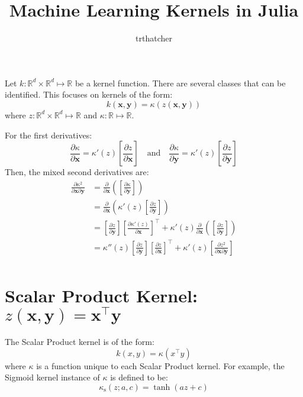 \documentclass[12pt, a4paper]{article}
\begin{document}

\title{Machine Learning Kernels in Julia}
\author{trthatcher}
\maketitle

Let $k:\mathbb{R}^d \times \mathbb{R}^d \mapsto \mathbb{R}$ be a kernel function. There are several classes that can be identified. This focuses on kernels of the form:
\begin{equation*}
    k(\mathbf{x}, \mathbf{y}) = \kappa(z(\mathbf{x}, \mathbf{y}))
\end{equation*}
where $z:\mathbb{R}^d \times \mathbb{R}^d \mapsto \mathbb{R}$ and $\kappa:\mathbb{R} \mapsto \mathbb{R}$.

For the first derivatives:
\begin{equation*}
    \frac{\partial \kappa}{\partial \mathbf{x}} 
    = \kappa'(z) \left[\frac{\partial z}{\partial \mathbf{x}}\right]
    \quad \text{and} \quad
    \frac{\partial \kappa}{\partial \mathbf{y}} 
    = \kappa'(z) \left[\frac{\partial z}{\partial \mathbf{y}}\right]
\end{equation*}
Then, the mixed second derivatives are:
\begin{align*}
    \frac{\partial \kappa^2}{\partial \mathbf{x} \partial \mathbf{y}}
    &= \frac{\partial}{\partial \mathbf{x}}\left(\left[\frac{\partial \kappa}{\partial \mathbf{y}}\right]\right)\\
    &= \frac{\partial}{\partial \mathbf{x}}\left(\kappa'(z)
    \left[\frac{\partial z}{\partial \mathbf{y}}\right]\right)\\
    &= \left[\frac{\partial z}{\partial \mathbf{y}}\right]
    \left[\frac{\partial \kappa'(z)}{\partial \mathbf{x}}\right]^{\intercal}
    + \kappa'(z)\frac{\partial}{\partial \mathbf{x}}\left(\left[\frac{\partial z}{\partial \mathbf{y}}\right]\right)\\
    &= \kappa''(z)\left[\frac{\partial z}{\partial \mathbf{y}}\right]
    \left[\frac{\partial z}{\partial \mathbf{x}}\right]^{\intercal}
    + \kappa'(z)\left[\frac{\partial z^2}{\partial \mathbf{x} \partial \mathbf{y}}\right]\\
\end{align*}


\section{Scalar Product Kernel: $z(\mathbf{x}, \mathbf{y}) = \mathbf{x}^\intercal\mathbf{y}$}
The Scalar Product kernel is of the form:
\begin{equation*}
    k(x,y) = \kappa\left(x^\intercal y\right)
\end{equation*}
where $\kappa$ is a function unique to each Scalar Product kernel. For example, the Sigmoid kernel instance of $\kappa$ is defined to be:
\begin{equation*}
    \kappa_{\mathrm{s}}(z;a,c) = \tanh(az + c)
\end{equation*}
\end{document}
